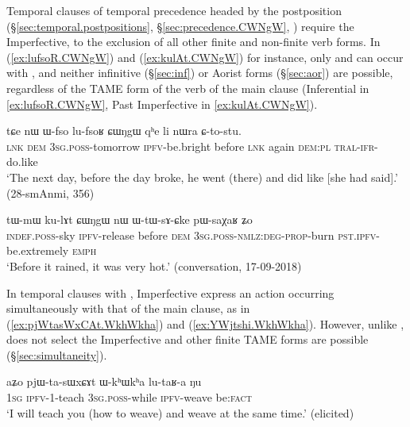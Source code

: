 Temporal clauses of temporal precedence headed by the postposition  (§\ref{sec:temporal.postpositions}, §\ref{sec:precedence.CWNgW}, \citealt[286--287]{jacques14linking}) require the Imperfective, to the exclusion of all other finite and non-finite verb forms. In (\ref{ex:lufsoR.CWNgW}) and (\ref{ex:kulAt.CWNgW}) for instance, only  and  can occur with , and neither infinitive (§\ref{sec:inf}) or Aorist forms (§\ref{sec:aor}) are possible, regardless of the TAME form of the verb of the main clause (Inferential in \ref{ex:lufsoR.CWNgW}, Past Imperfective in \ref{ex:kulAt.CWNgW}).

\begin{exe}
\ex \label{ex:lufsoR.CWNgW}
\gll tɕe nɯ ɯ-fso lu-fsoʁ ɕɯŋgɯ qʰe li nɯra ɕ-to-stu. \\
\textsc{lnk} \textsc{dem} \textsc{3sg}.\textsc{poss}-tomorrow \textsc{ipfv}-be.bright before \textsc{lnk} again \textsc{dem}:\textsc{pl} \textsc{tral}-\textsc{ifr}-do.like \\
\glt `The next day, before the day broke, he went (there) and did like [she had said].' (28-smAnmi, 356)
\end{exe}

\begin{exe}
\ex \label{ex:kulAt.CWNgW}
\gll tɯ-mɯ ku-lɤt ɕɯŋgɯ nɯ ɯ-tɯ-sɤ-ɕke pɯ-saχaʁ ʑo \\
\textsc{indef}.\textsc{poss}-sky \textsc{ipfv}-release before \textsc{dem} \textsc{3sg}.\textsc{poss}-\textsc{nmlz}:\textsc{deg}-\textsc{prop}-burn \textsc{pst}.\textsc{ipfv}-be.extremely \textsc{emph} \\
\glt `Before it rained, it was very hot.' (conversation, 17-09-2018)
\end{exe}

In temporal clauses with , Imperfective express an action occurring simultaneously with that of the main clause, as in (\ref{ex:pjWtasWxCAt.WkhWkha}) and (\ref{ex:YWjtshi.WkhWkha}). However, unlike ,  does not select the Imperfective and other finite TAME forms are possible (§\ref{sec:simultaneity}).

\begin{exe}
\ex \label{ex:pjWtasWxCAt.WkhWkha}
\gll aʑo pjɯ-ta-sɯxɕɤt ɯ-kʰɯkʰa lu-taʁ-a ŋu \\
\textsc{1sg} \textsc{ipfv}-1\fl{}-teach \textsc{3sg}.\textsc{poss}-while \textsc{ipfv}-weave be:\textsc{fact} \\
\glt `I will teach you (how to weave) and weave at the same time.' (elicited)
\end{exe}

